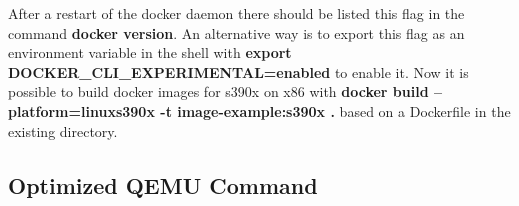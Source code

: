 After a restart of the docker daemon there should be listed this flag in the command \textbf{docker version}. An alternative way is to export this flag as an environment variable in the shell with \textbf{export DOCKER\_CLI\_EXPERIMENTAL=enabled} to enable it. Now it is possible to build docker images for s390x on x86 with \textbf{docker build --platform=linux\/s390x -t image-example:s390x .} based on a Dockerfile in the existing directory.

 

 

\subsection{Optimized QEMU Command}



\Blindtext
